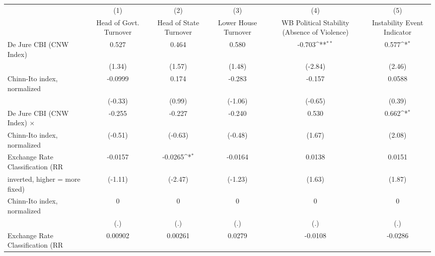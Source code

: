 {
\def\sym#1{\ifmmode^{#1}\else\(^{#1}\)\fi}
\begin{tabular}{l*{5}{c}}
\toprule
                                        &\multicolumn{1}{c}{(1)}&\multicolumn{1}{c}{(2)}&\multicolumn{1}{c}{(3)}&\multicolumn{1}{c}{(4)}&\multicolumn{1}{c}{(5)}\\
                                        &\multicolumn{1}{c}{Head of Govt. Turnover}&\multicolumn{1}{c}{Head of State Turnover}&\multicolumn{1}{c}{Lower House Turnover}&\multicolumn{1}{c}{WB Political Stability (Absence of Violence)}&\multicolumn{1}{c}{Instability Event Indicator}\\
\midrule
De Jure CBI (CNW Index)                 &    0.527         &    0.464         &    0.580         &   -0.703\sym{**} &    0.577\sym{*}  \\
                                        &   (1.34)         &   (1.57)         &   (1.48)         &  (-2.84)         &   (2.46)         \\
\addlinespace
Chinn-Ito index, normalized             &  -0.0999         &    0.174         &   -0.283         &   -0.157         &   0.0588         \\
                                        &  (-0.33)         &   (0.99)         &  (-1.06)         &  (-0.65)         &   (0.39)         \\
\addlinespace
De Jure CBI (CNW Index) $\times$        &   -0.255         &   -0.227         &   -0.240         &    0.530         &    0.662\sym{*}  \\
Chinn-Ito index, normalized             &  (-0.51)         &  (-0.63)         &  (-0.48)         &   (1.67)         &   (2.08)         \\
\addlinespace
Exchange Rate Classification (RR        &  -0.0157         &  -0.0265\sym{*}  &  -0.0164         &   0.0138         &   0.0151         \\
inverted, higher = more fixed)          &  (-1.11)         &  (-2.47)         &  (-1.23)         &   (1.63)         &   (1.87)         \\
\addlinespace
Chinn-Ito index, normalized             &        0         &        0         &        0         &        0         &        0         \\
                                        &      (.)         &      (.)         &      (.)         &      (.)         &      (.)         \\
\addlinespace
Exchange Rate Classification (RR        &  0.00902         &  0.00261         &   0.0279         &  -0.0108         &  -0.0286         \\

\end{tabular}}
